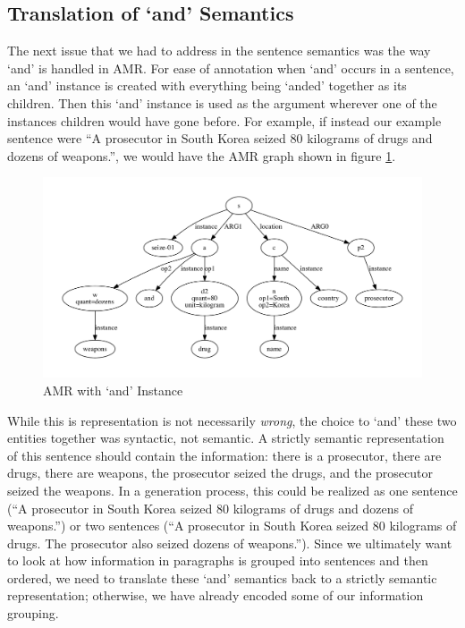 \documentclass[12pt]{article}
\begin{document}
\subsection{Translation of `and' Semantics}
The next issue that we had to address in the sentence semantics was the way `and' is handled in AMR. For ease of annotation when `and' occurs in a sentence, an `and' instance is created with everything being `anded' together as its children. Then this `and' instance is used as the argument wherever one of the instances children would have gone before. For example, if instead our example sentence were ``A prosecutor in South Korea seized 80 kilograms of drugs and dozens of weapons.'', we would have the AMR graph shown in figure \ref{fig:amr_example_and}.

\begin{figure}
\includegraphics[width=\linewidth]{amr_example_and.pdf}
\caption{AMR with `and' Instance}
\label{fig:amr_example_and}
\end{figure}

While this is representation is not necessarily {\em wrong}, the choice to `and' these two entities together was syntactic, not semantic. A strictly semantic representation of this sentence should contain the information: there is a prosecutor, there are drugs, there are weapons, the prosecutor seized the drugs, and the prosecutor seized the weapons. In a generation process, this could be realized as one sentence (``A prosecutor in South Korea seized 80 kilograms of drugs and dozens of weapons.'') or two sentences (``A prosecutor in South Korea seized 80 kilograms of drugs. The prosecutor also seized dozens of weapons.''). Since we ultimately want to look at how information in paragraphs is grouped into sentences and then ordered, we need to translate these `and' semantics back to a strictly semantic representation; otherwise, we have already encoded some of our information grouping.
\end{document}
